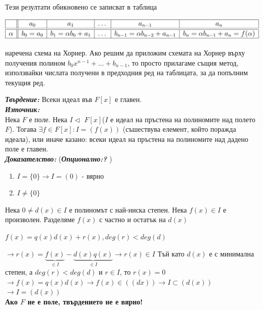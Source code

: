 \documentclass[11pt]{article} %
\newcommand{\italicBold}[1]{\textbf{\emph{#1}}}
\newcommand{\proof}{\italicBold{Доказателство: }}
\newcommand{\statement}{\italicBold{Твърдение: }}
\newcommand{\source}{\italicBold{Източник: }}
\newcommand{\curlies}[1]{\{#1\}}
\newcommand{\enumNum}{\renewcommand{\theenumi}{\arabic{enumi}}}
\begin{document}
Тези резултати обикновено се записват в таблица\\ 
\begin{center}
	\includegraphics[scale=0.45]{Horner.png}
\end{center}
наречена схема на Хорнер. Ако решим да приложим схемата на Хорнер върху получения полином $b_{0}x^{n-1}+...+b_{n-1}$, то просто прилагаме същия метод, използвайки числата получени в предходния ред на таблицата, за да попълним текущия ред. \\\par

\statement Всеки идеал във $F[x]$ е главен.\\
\source {}\\

Нека $F$ е поле. Нека $I \triangleleft$ $F[x]$($I$ е идеал на пръстена на полиномите над полето $F$). Тогава $\exists f \in F[x]: I = (f(x))$ (съшествува елемент, който поражда идеала), или иначе казано: всеки идеал на пръстена на полиномите над дадено поле е главен.\\

\proof (\italicBold{Опционално:? })\\

\enumNum
\begin{enumerate}
	\item $I = \curlies{0} \rightarrow I = (0)$ - вярно \\
	\item $I \neq \curlies{0}$\\
\end{enumerate}
Нека $0 \neq d(x) \in I$ е полиномът с най-ниска степен. Нека $f(x) \in I$ е произволен. Разделяме $f(x)$ с частно и остатък на $d(x)$\\
\centerline{$f(x) = q(x)d(x)+r(x), deg(r) < deg(d)$}
$\rightarrow r(x) = \underbrace{f(x)}_{\in I}-\underbrace{d(x)q(x)}_{\in I} \rightarrow r(x)\in I$
Тъй като $d(x)$ е с минимална степен, а $deg(r) < deg(d)$ и $r \in I$, то $r(x) = 0$\\
$\rightarrow f(x)=q(x)d(x)\rightarrow f(x) \in ((dx)) \rightarrow I \subset (d(x))$\\
$\rightarrow I = (d(x))$\\
\textbf{Ако $F$ не е поле, твърдението не е вярно!}\\\par
\end{document}
